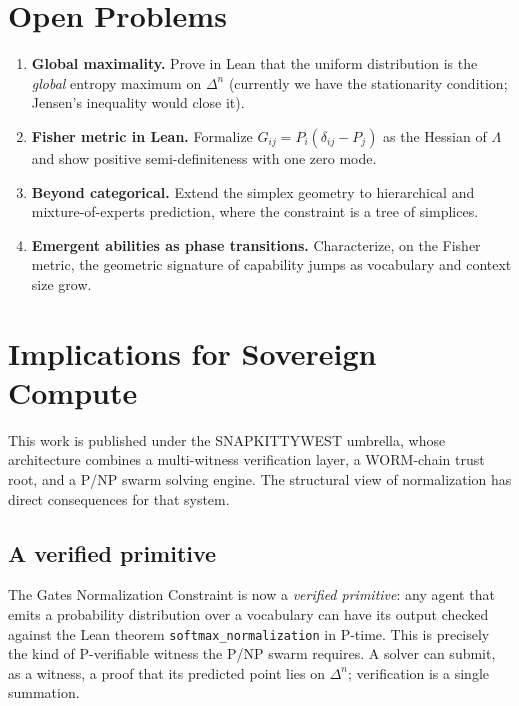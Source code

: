 \documentclass[11pt]{article}
\newcommand{\simplex}[1]{\Delta^{#1}}
\begin{document}
\section{Open Problems}
\label{sec:open}

\begin{enumerate}
\item \textbf{Global maximality.} Prove in Lean that the uniform distribution is
the \emph{global} entropy maximum on $\simplex{n}$ (currently we have the
stationarity condition; Jensen's inequality would close it).
\item \textbf{Fisher metric in Lean.} Formalize $G_{ij}=P_i(\delta_{ij}-P_j)$
as the Hessian of $\Lambda$ and show positive semi-definiteness with one zero
mode.
\item \textbf{Beyond categorical.} Extend the simplex geometry to hierarchical
and mixture-of-experts prediction, where the constraint is a tree of simplices.
\item \textbf{Emergent abilities as phase transitions.} Characterize, on the
Fisher metric, the geometric signature of capability jumps as vocabulary and
context size grow.
\end{enumerate}

\section{Implications for Sovereign Compute}
\label{sec:sovereign}

This work is published under the SNAPKITTYWEST umbrella, whose architecture
combines a multi-witness verification layer, a WORM-chain trust root, and a
P/NP swarm solving engine. The structural view of normalization has direct
consequences for that system.

\subsection{A verified primitive}
\label{sec:sov-prim}

The Gates Normalization Constraint is now a \emph{verified primitive}: any
agent that emits a probability distribution over a vocabulary can have its
output checked against the Lean theorem \texttt{softmax\_normalization} in
P-time. This is precisely the kind of P-verifiable witness the P/NP swarm
requires. A solver can submit, as a witness, a proof that its predicted point
lies on $\simplex{n}$; verification is a single summation.
\end{document}
